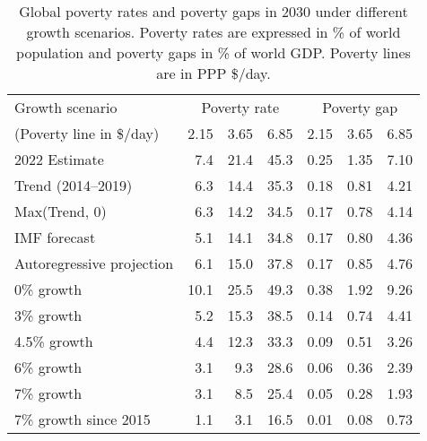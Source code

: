 \begin{table}[h]

\caption{\label{tab:poverty_full}Global poverty rates and poverty gaps in 2030 under different growth scenarios. Poverty rates are expressed in \% of world population and poverty gaps in \% of world GDP. Poverty lines are in PPP \$/day.}
\centering
\begin{tabular}[t]{lrrrrrr}
\toprule Growth scenario & \multicolumn{3}{c}{Poverty rate} & \multicolumn{3}{c}{Poverty gap} \\ 
 (Poverty line in \$/day)  & 2.15 & 3.65 & 6.85 & 2.15 & 3.65 & 6.85\\
\midrule
2022 Estimate & 7.4 & 21.4 & 45.3 & 0.25 & 1.35 & 7.10\\
Trend (2014--2019) & 6.3 & 14.4 & 35.3 & 0.18 & 0.81 & 4.21\\
Max(Trend, 0) & 6.3 & 14.2 & 34.5 & 0.17 & 0.78 & 4.14\\
IMF forecast & 5.1 & 14.1 & 34.8 & 0.17 & 0.80 & 4.36\\
Autoregressive projection & 6.1 & 15.0 & 37.8 & 0.17 & 0.85 & 4.76\\
0\% growth & 10.1 & 25.5 & 49.3 & 0.38 & 1.92 & 9.26\\
3\% growth & 5.2 & 15.3 & 38.5 & 0.14 & 0.74 & 4.41\\
4.5\% growth & 4.4 & 12.3 & 33.3 & 0.09 & 0.51 & 3.26\\
6\% growth & 3.1 & 9.3 & 28.6 & 0.06 & 0.36 & 2.39\\
7\% growth & 3.1 & 8.5 & 25.4 & 0.05 & 0.28 & 1.93\\
7\% growth since 2015 & 1.1 & 3.1 & 16.5 & 0.01 & 0.08 & 0.73\\
\bottomrule
\end{tabular}
\end{table}